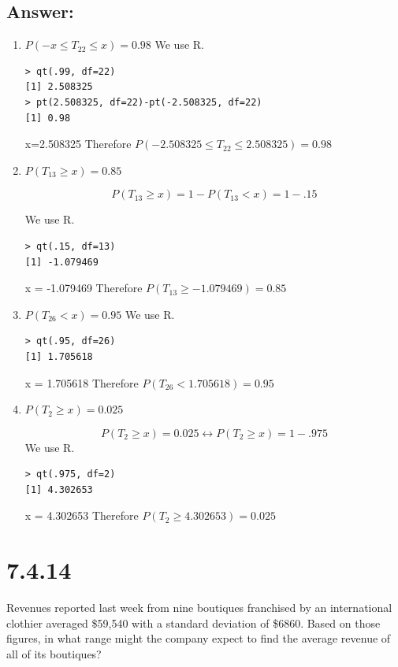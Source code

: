 \documentclass[svgnames]{article}
\begin{document}
\subsection*{Answer:}
\begin{enumerate}[label = (\alph*)]
\item $P(-x\leq T_{22} \leq x) = 0.98$
\newline
We use R.
\begin{lstlisting}
> qt(.99, df=22)
[1] 2.508325
> pt(2.508325, df=22)-pt(-2.508325, df=22)
[1] 0.98
\end{lstlisting}
x=2.508325
\newline
Therefore $P(-2.508325\leq T_{22} \leq 2.508325) = 0.98$

\item $P(T_{13} \geq x) = 0.85$

$$P(T_{13} \geq x) =  1- P(T_{13} < x) = 1 -  .15 $$

We use R.
\begin{lstlisting}
> qt(.15, df=13)
[1] -1.079469
\end{lstlisting}
x = -1.079469
\newline
Therefore $P(T_{13} \geq -1.079469) = 0.85$

\item $P(T_{26} < x) = 0.95$
\newline
We use R.
\begin{lstlisting}
> qt(.95, df=26)
[1] 1.705618
\end{lstlisting}
x = 1.705618
\newline
Therefore $P(T_{26} < 1.705618) = 0.95$


\item $P(T_{2} \geq x) = 0.025$

$$P(T_{2} \geq x) = 0.025 \leftrightarrow P(T_{2} \geq x) = 1 - .975 $$
\newline
We use R.
\begin{lstlisting}
> qt(.975, df=2)
[1] 4.302653
\end{lstlisting}
x = 4.302653
\newline
Therefore $P(T_{2} \geq 4.302653) = 0.025$
\end{enumerate}

\section{7.4.14}

Revenues reported last week from nine boutiques franchised by an international clothier averaged \$59,540 with a standard deviation of \$6860. Based on those figures, in what range might the company expect to find the average revenue of all of its boutiques?
\end{document}
